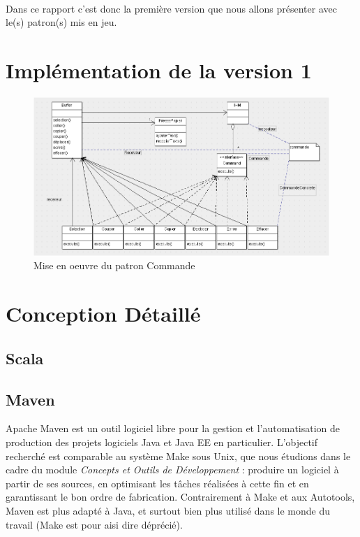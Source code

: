 \documentclass[a4paper,11pt]{article}
\begin{document}
\paragraph{}
Dans ce rapport c'est donc la première version que nous allons présenter avec le(s) patron(s) mis en jeu.

\section{Implémentation de la version 1}


\begin{figure}[!ht]
		\center
		\includegraphics [width=15cm]{Command.png}
		\caption{Mise en oeuvre du patron Commande}
\end{figure}




\section{Conception Détaillé}

\subsection{Scala}



\subsection{Maven}
Apache Maven est un outil logiciel libre pour la gestion et l'automatisation de production des projets logiciels Java et Java EE en particulier. L'objectif recherché est comparable au système Make sous Unix, que nous étudions dans le cadre du module \textit{Concepts et Outils de Développement} : produire un logiciel à partir de ses sources, en optimisant les tâches réalisées à cette fin et en garantissant le bon ordre de fabrication. Contrairement à Make et aux Autotools, Maven est plus adapté à Java, et surtout bien plus utilisé dans le monde du travail (Make est pour aisi dire déprécié).
\end{document}
